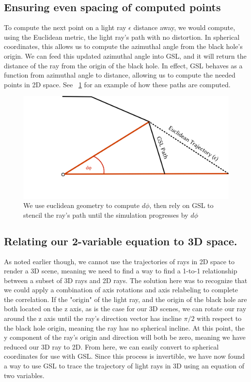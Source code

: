 \subsection{Ensuring even spacing of computed points}
To compute the next point on a light ray $\epsilon$ distance away, we would compute, using the Euclidean metric, the light ray's path with no distortion. In spherical coordinates, this allows us to compute the azimuthal angle from the black hole's origin. We can feed this updated azimuthal angle into GSL, and it will return the distance of the ray from the origin of the black hole. In effect, GSL behaves as a function from azimuthal angle to distance, allowing us to compute the needed points in 2D space. See ~\ref{fig:one} for an example of how these paths are computed.

\begin{figure}[h]
  \centering
  \includegraphics[width=.65\linewidth]{figs/nextpoint}
  \caption{We use euclidean geometry to compute $d\phi$, then rely on GSL to stencil the ray's path until the simulation progresses by $d\phi$}
  \label{fig:one}
\end{figure}


\subsection{Relating our 2-variable equation to 3D space.}
As noted earlier though, we cannot use the trajectories of rays in 2D space to render a 3D scene, meaning we need to find a way to find a 1-to-1 relationship between a subset of 3D rays and 2D rays. The solution here was to recognize that we could apply a combination of axis rotations and axis relabeling to complete the correlation. If the "origin" of the light ray, and the origin of the black hole are both located on the z axis, as is the case for our 3D scenes, we can rotate our ray around the z axis until the ray's direction vector has incline $ \pi / 2 $ with respect to the black hole origin, meaning the ray has no spherical incline. At this point, the y component of the ray's origin and direction will both be zero, meaning we have reduced our 3D ray to 2D. From here, we can easily convert to spherical coordinates for use with GSL. Since this process is invertible, we have now found a way to use GSL to trace the trajectory of light rays in 3D using an equation of two variables.


